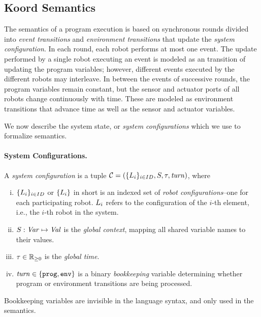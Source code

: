 \subsection{Koord Semantics}
\label{sec:configs}

The semantics of a \lgname program execution is based on synchronous rounds divided into \emph{event transitions} and \emph{environment transitions} that update the \emph{system configuration}.
In each round, each robot performs at most one event.
The update performed by a single robot executing an event is modeled as an transition of updating the program variables;
however, different events executed by the different robots may interleave.
In between the events of successive rounds, the program variables remain constant,
but the sensor and actuator ports of all robots change continuously with time.
These are modeled as environment transitions that advance time as well as the sensor and actuator variables.

We now describe the system state, or \emph{system configurations} which we use to formalize \lgname semantics.

\paragraph{System Configurations.}

A \emph{system configuration} is a tuple $\mathcal{C} = (\{L_{i}\}_{i\in ID},{S},\tau,\mathit{turn})$, where

\begin{enumerate}[(i)]
\item $\{L_{i}\}_{i\in ID}$ or $\{L_{i}\}$ in short is an indexed set of \emph{robot configurations}--one for each participating robot.
      $L_{i}$ refers to the configuration of the $i$-th element, i.e., the $i$-th robot in the system.
\item ${S} : \mathit{Var} \mapsto \mathit{Val}$ is the {\em global context\/}, mapping all shared variable names to their values.
\item $\tau\in \nnreals$ is the {\em global time\/}.
\item $\mathit{turn}\in\{\mathtt{prog},\mathtt{env}\}$ is a binary \emph{bookkeeping} variable determining whether  program or environment transitions are being processed.
\end{enumerate}

Bookkeeping variables are invisible in the language syntax, and only used in the semantics.


